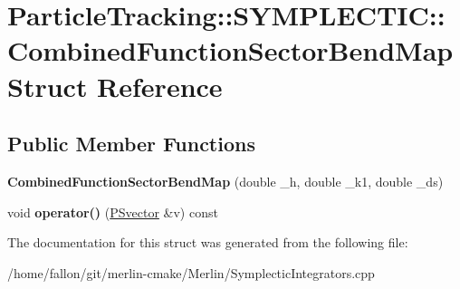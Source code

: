 \hypertarget{structParticleTracking_1_1SYMPLECTIC_1_1CombinedFunctionSectorBendMap}{}\section{Particle\+Tracking\+:\+:S\+Y\+M\+P\+L\+E\+C\+T\+IC\+:\+:Combined\+Function\+Sector\+Bend\+Map Struct Reference}
\label{structParticleTracking_1_1SYMPLECTIC_1_1CombinedFunctionSectorBendMap}
\subsection*{Public Member Functions}
\begin{DoxyCompactItemize}
\item 
\mbox{\label{structParticleTracking_1_1SYMPLECTIC_1_1CombinedFunctionSectorBendMap_a70f052af5ba4063ebbb54c2fc254171f}} 
{\bfseries Combined\+Function\+Sector\+Bend\+Map} (double \+\_\+h, double \+\_\+k1, double \+\_\+ds)
\item 
\mbox{\label{structParticleTracking_1_1SYMPLECTIC_1_1CombinedFunctionSectorBendMap_aff39718739fdc8fd508b1dcf238e8031}} 
void {\bfseries operator()} (\hyperlink{classPSvector}{P\+Svector} \&v) const
\end{DoxyCompactItemize}


The documentation for this struct was generated from the following file\+:\begin{DoxyCompactItemize}
\item 
/home/fallon/git/merlin-\/cmake/\+Merlin/Symplectic\+Integrators.\+cpp\end{DoxyCompactItemize}
